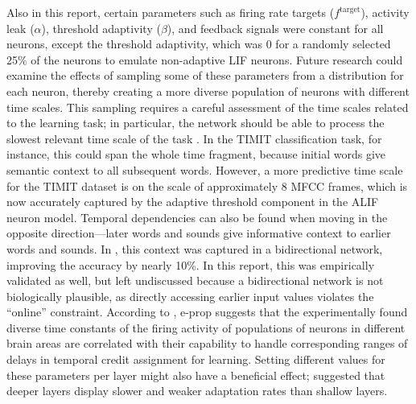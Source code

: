     Also in this report, certain parameters such as firing rate targets ($f^\text{target}$), activity leak ($\alpha$), threshold adaptivity ($\beta$), and feedback signals were constant for all neurons, except the threshold adaptivity, which was 0 for a randomly selected 25\% of the neurons to emulate non-adaptive LIF neurons.
    Future research could examine the effects of sampling some of these parameters from a distribution for each neuron, thereby creating a more diverse population of neurons with different time scales.
    This sampling requires a careful assessment of the time scales related to the learning task; in particular, the network should be able to process the slowest relevant time scale of the task \citep{jaeger2021dimensions}.
    In the TIMIT classification task, for instance, this could span the whole time fragment, because initial words give semantic context to all subsequent words.
    However, a more predictive time scale for the TIMIT dataset is on the scale of approximately 8 MFCC frames, which is now accurately captured by the adaptive threshold component in the ALIF neuron model.
    Temporal dependencies can also be found when moving in the opposite direction---later words and sounds give informative context to earlier words and sounds.
    In \citet{bellec2020solution}, this context was captured in a bidirectional network, improving the accuracy by nearly 10\%.
    In this report, this was empirically validated as well, but left undiscussed because a bidirectional network is not biologically plausible, as directly accessing earlier input values violates the ``online'' constraint.
    According to \citet{bellec2020solution}, e-prop suggests that the experimentally found diverse time constants of the firing activity of populations of neurons in different brain areas \citep{runyan2017distinct} are correlated with their capability to handle corresponding ranges of delays in temporal credit assignment for learning.
    Setting different values for these parameters per layer might also have a beneficial effect; \citet{ahmed1998estimates} suggested that deeper layers display slower and weaker adaptation rates than shallow layers.

